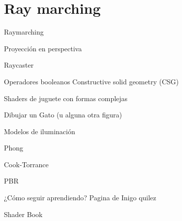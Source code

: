 \section{Ray marching}
\begin{frame}{Raymarching}

\end{frame}

\begin{frame}{Proyección en perspectiva}

\end{frame}

\begin{frame}{Raycaster}

\end{frame}

\begin{frame}{Operadores booleanos}
Constructive solid geometry (CSG)
\end{frame}

\begin{frame}{}
Shaders de juguete con formas complejas

Dibujar un Gato (u alguna otra figura)
\end{frame}


\begin{frame}{Modelos de iluminación}

\end{frame}

\begin{frame}{Phong}

\end{frame}

\begin{frame}{Cook-Torrance}

\end{frame}

\begin{frame}{PBR}

\end{frame}

\begin{frame}{¿Cómo seguir aprendiendo?}
Pagina de Inigo quilez

Shader Book

\end{frame}
